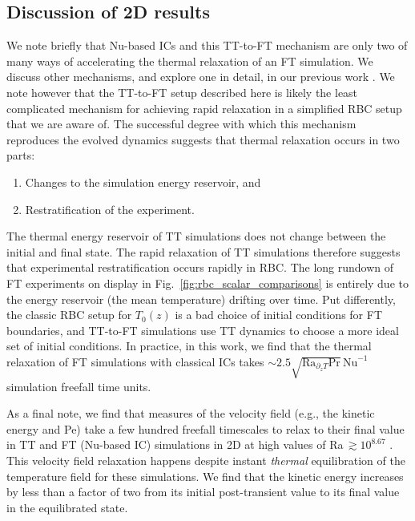 \documentclass[aps, pre, onecolumn, nofootinbib, notitlepage, groupedaddress, amsfonts, amssymb, amsmath, longbibliography, superscriptaddress]{revtex4-1}
\newcommand{\ea}[1]{{\color{red} #1}}
\begin{document}
\subsection{\ea{Discussion of 2D results}} We note briefly that \ea{Nu-based ICs and} this TT-to-FT mechanism \ea{are} only \ea{two} of many ways of accelerating the thermal relaxation of an FT simulation.
We discuss other mechanisms, and explore one in detail, in our previous work \cite{anders&all2018}.
We note however that the TT-to-FT setup described here is likely the least complicated mechanism for achieving rapid relaxation in a simplified RBC setup that we are aware of.
The successful degree with which this mechanism reproduces the evolved dynamics suggests that thermal relaxation occurs in two parts:
\begin{enumerate}
\item Changes to the simulation energy reservoir, and
\item Restratification of the experiment.
\end{enumerate}
The thermal energy reservoir of TT simulations does not change between the initial and final state.
The rapid relaxation of TT simulations therefore suggests that experimental restratification occurs rapidly in RBC. 
The long rundown of FT experiments on display in Fig.~\ref{fig:rbc_scalar_comparisons} is entirely due to the energy reservoir (the mean temperature) drifting over time.
Put differently, the classic RBC setup for $T_0(z)$ is a bad choice of initial conditions for FT boundaries, and TT-to-FT simulations use TT dynamics to choose a more ideal set of initial conditions.
\ea{In practice, in this work, we find that the thermal relaxation of FT simulations with classical ICs takes $\sim 2.5\sqrt{\text{Ra}_{\partial_z T} \text{Pr}}\,\text{Nu}^{-1}$ simulation freefall time units.}

\ea{
As a final note, we find that measures of the velocity field (e.g., the kinetic energy and Pe) take a few hundred freefall timescales to relax to their final value in TT and FT (Nu-based IC) simulations in 2D at high values of Ra$\,\gtrsim 10^{8.67}$ .
This velocity field relaxation happens despite instant \emph{thermal} equilibration of the temperature field for these simulations.
We find that the kinetic energy increases by less than a factor of two from its initial post-transient value to its final value in the equilibrated state.
}
\end{document}
